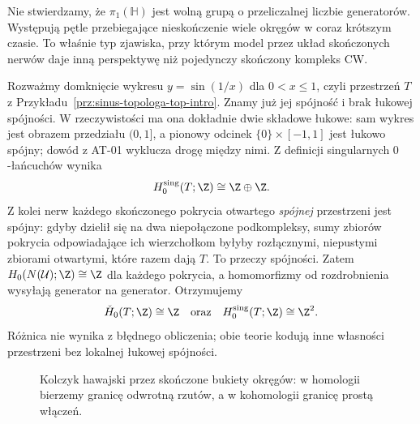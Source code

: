 \begin{uwaga}
Nie stwierdzamy, że $\pi_1(\mathbb H)$ jest wolną grupą o
przeliczalnej liczbie generatorów. Występują pętle
przebiegające nieskończenie wiele okręgów w coraz krótszym
czasie. To właśnie typ zjawiska, przy którym model przez
układ skończonych nerwów daje inną perspektywę niż
pojedynczy skończony kompleks CW.
\end{uwaga}

\begin{przyklad}
\label{prz:cech-sinus-stopien-zero}
Rozważmy domknięcie wykresu $y=\sin(1/x)$ dla
$0<x\le1$, czyli przestrzeń $T$ z
Przykładu~\ref{prz:sinus-topologa-top-intro}.
Znamy już jej spójność i brak łukowej spójności.
W rzeczywistości ma ona dokładnie dwie składowe
łukowe: sam wykres jest obrazem przedziału $(0,1]$,
a pionowy odcinek $\{0\}\times[-1,1]$ jest łukowo
spójny; dowód z AT-01 wyklucza drogę między nimi.
Z definicji singularnych $0$-łańcuchów wynika
\[
 H_0^{\mathrm{sing}}(T;\Z)\cong\Z\oplus\Z.
\]
Z kolei nerw każdego skończonego pokrycia
otwartego \emph{spójnej} przestrzeni jest spójny:
gdyby dzielił się na dwa niepołączone podkompleksy,
sumy zbiorów pokrycia odpowiadające ich wierzchołkom
byłyby rozłącznymi, niepustymi zbiorami otwartymi,
które razem dają $T$. To przeczy spójności.
Zatem $H_0(N(\mathcal U);\Z)\cong\Z$ dla każdego
pokrycia, a homomorfizmy od rozdrobnienia
wysyłają generator na generator. Otrzymujemy
\[
 \check H_0(T;\Z)\cong\Z
 \quad\text{oraz}\quad
 H_0^{\mathrm{sing}}(T;\Z)\cong\Z^2.
\]
Różnica nie wynika z błędnego obliczenia;
obie teorie kodują inne własności
przestrzeni bez lokalnej łukowej spójności.
\end{przyklad}

\begin{figure}[!htbp]
\centering
{}
\caption{Kolczyk hawajski przez skończone bukiety okręgów:
w homologii bierzemy granicę odwrotną rzutów,
a w kohomologii granicę prostą włączeń.}
\label{fig:cech-hawajski-granice}
\end{figure}

